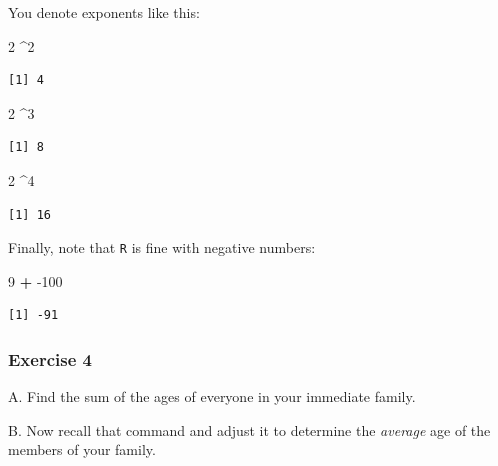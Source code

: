 \documentclass[
]{book}
\newenvironment{Shaded}{\begin{snugshade}}{\end{snugshade}}
\newcommand{\DecValTok}[1]{\textcolor[rgb]{0.00,0.00,0.81}{#1}}
\newcommand{\OperatorTok}[1]{\textcolor[rgb]{0.81,0.36,0.00}{\textbf{#1}}}
\newcommand{\StringTok}[1]{\textcolor[rgb]{0.31,0.60,0.02}{#1}}
\begin{document}
You denote exponents like this:

\begin{Shaded}
\begin{Highlighting}[]
\DecValTok{2} \OperatorTok{^}\DecValTok{2}
\end{Highlighting}
\end{Shaded}

\begin{verbatim}
[1] 4
\end{verbatim}

\begin{Shaded}
\begin{Highlighting}[]
\DecValTok{2} \OperatorTok{^}\DecValTok{3}
\end{Highlighting}
\end{Shaded}

\begin{verbatim}
[1] 8
\end{verbatim}

\begin{Shaded}
\begin{Highlighting}[]
\DecValTok{2} \OperatorTok{^}\DecValTok{4}
\end{Highlighting}
\end{Shaded}

\begin{verbatim}
[1] 16
\end{verbatim}

Finally, note that \texttt{R} is fine with negative numbers:

\begin{Shaded}
\begin{Highlighting}[]
\DecValTok{9} \OperatorTok{+}\StringTok{ }\DecValTok{-100}
\end{Highlighting}
\end{Shaded}

\begin{verbatim}
[1] -91
\end{verbatim}

\hypertarget{exercise-4}{%
\subsubsection*{Exercise 4}\label{exercise-4}}

A. Find the sum of the ages of everyone in your immediate family.

B. Now recall that command and adjust it to determine the \emph{average} age of the members of your family.
\end{document}
